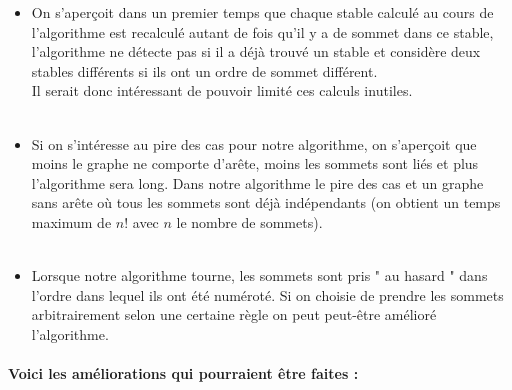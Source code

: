 \documentclass[10pt,a4paper]{article}
\begin{document}
\begin{itemize}
\item On s'aperçoit dans un premier temps que chaque stable calculé au cours de l'algorithme est recalculé autant de fois qu'il y a de sommet dans ce stable, l'algorithme ne détecte pas si il a déjà trouvé un stable et considère deux stables différents si ils ont un ordre de sommet différent. \\ 
Il serait donc intéressant de pouvoir limité ces calculs inutiles.
\\\\
\item Si on s'intéresse au pire des cas pour notre algorithme, on s'aperçoit que moins le graphe ne comporte d'arête, moins les sommets sont liés et plus l'algorithme sera long. Dans notre algorithme le pire des cas et un graphe sans arête où tous les sommets sont déjà indépendants (on obtient un temps maximum de $n!$ avec $n$ le nombre de sommets).
\\\\
\item Lorsque notre algorithme tourne, les sommets sont pris " au hasard " dans l'ordre dans lequel ils ont été numéroté. Si on choisie de prendre les sommets arbitrairement selon une certaine règle on peut peut-être amélioré l'algorithme.
\end{itemize}

\paragraph{Voici les améliorations qui pourraient être faites : }
\end{document}

